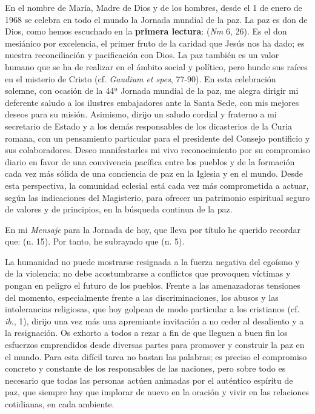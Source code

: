 \begin{body}
\begin{body}
{En el nombre de María, Madre de Dios y de los hombres, desde el 1 de enero de 1968 se celebra en todo el mundo la Jornada mundial de la paz. La paz es don de Dios, como hemos escuchado en la \textbf{primera lectura}:  (\emph{Nm} 6, 26). Es el don mesiánico por excelencia, el primer fruto de la caridad que Jesús nos ha dado; es nuestra reconciliación y pacificación con Dios. La paz también es un valor humano que se ha de realizar en el ámbito social y político, pero hunde sus raíces en el misterio de Cristo (cf. \emph{Gaudium et spes}, 77-90). En esta celebración solemne, con ocasión de la 44ª Jornada mundial de la paz, me alegra dirigir mi deferente saludo a los ilustres embajadores ante la Santa Sede, con mis mejores deseos para su misión. Asimismo, dirijo un saludo cordial y fraterno a mi secretario de Estado y a los demás responsables de los dicasterios de la Curia romana, con un pensamiento particular para el presidente del Consejo pontificio  y sus colaboradores. Deseo manifestarles mi vivo reconocimiento por su compromiso diario en favor de una convivencia pacífica entre los pueblos y de la formación cada vez más sólida de una conciencia de paz en la Iglesia y en el mundo. Desde esta perspectiva, la comunidad eclesial está cada vez más comprometida a actuar, según las indicaciones del Magisterio, para ofrecer un patrimonio espiritual seguro de valores y de principios, en la búsqueda continua de la paz.

En mi \emph{Mensaje} para la Jornada de hoy, que lleva por título  he querido recordar que:  (n. 15). Por tanto, he subrayado que  (n. 5).

La humanidad no puede mostrarse resignada a la fuerza negativa del egoísmo y de la violencia; no debe acostumbrarse a conflictos que provoquen víctimas y pongan en peligro el futuro de los pueblos. Frente a las amenazadoras tensiones del momento, especialmente frente a las discriminaciones, los abusos y las intolerancias religiosas, que hoy golpean de modo particular a los cristianos (cf. \emph{ib}., 1), dirijo una vez más una apremiante invitación a no ceder al desaliento y a la resignación. Os exhorto a todos a rezar a fin de que lleguen a buen fin los esfuerzos emprendidos desde diversas partes para promover y construir la paz en el mundo. Para esta difícil tarea no bastan las palabras; es preciso el compromiso concreto y constante de los responsables de las naciones, pero sobre todo es necesario que todas las personas actúen animadas por el auténtico espíritu de paz, que siempre hay que implorar de nuevo en la oración y vivir en las relaciones cotidianas, en cada ambiente.

}
\end{body}
\end{body}
